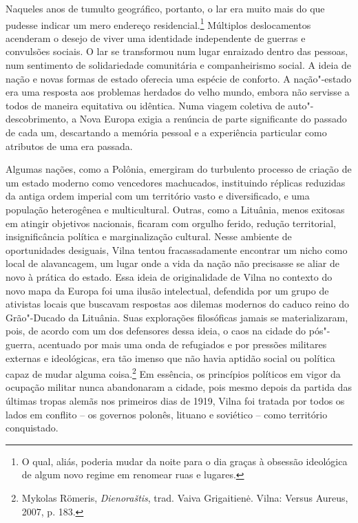 Naqueles anos de tumulto geográfico, portanto, o lar era muito mais do
que pudesse indicar um mero endereço residencial.\footnote{O qual, aliás, poderia
mudar da noite para o dia graças à obsessão ideológica de algum novo
regime em renomear ruas e lugares.} Múltiplos deslocamentos acenderam o
desejo de viver uma identidade independente de guerras e convulsões
sociais. O lar se transformou num lugar enraizado dentro das pessoas,
num sentimento de solidariedade comunitária e companheirismo social. A
ideia de nação e novas formas de estado oferecia uma espécie de
conforto. A nação"-estado era uma resposta aos problemas herdados do
velho mundo, embora não servisse a todos de maneira equitativa ou
idêntica. Numa viagem coletiva de auto"-descobrimento, a Nova Europa
exigia a renúncia de parte significante do passado de cada um,
descartando a memória pessoal e a experiência particular como atributos
de uma era passada.

Algumas nações, como a Polônia, emergiram do turbulento processo de
criação de um estado moderno como vencedores machucados, instituindo
réplicas reduzidas da antiga ordem imperial com um território vasto e
diversificado, e uma população heterogênea e multicultural. Outras, como
a Lituânia, menos exitosas em atingir objetivos nacionais, ficaram com
orgulho ferido, redução territorial, insignificância política e
marginalização cultural. Nesse ambiente de oportunidades desiguais,
Vilna tentou fracassadamente encontrar um nicho como local de
alavancagem, um lugar onde a vida da nação não precisasse se aliar de
novo à prática do estado. Essa ideia de originalidade de Vilna no
contexto do novo mapa da Europa foi uma ilusão intelectual, defendida
por um grupo de ativistas locais que buscavam respostas aos dilemas
modernos do caduco reino do Grão"-Ducado da Lituânia. Suas explorações
filosóficas jamais se materializaram, pois, de acordo com um dos
defensores dessa ideia, o caos na cidade do pós"-guerra, acentuado por
mais uma onda de refugiados e por pressões militares externas e
ideológicas, era tão imenso que não havia aptidão social ou política
capaz de mudar alguma coisa.\footnote{Mykolas Römeris, \textit{Dienoraštis}, trad. Vaiva Grigaitienė. Vilna: Versus Aureus, 2007, p. 183.} Em essência, os princípios políticos em vigor da ocupação militar nunca abandonaram a cidade, pois mesmo depois da
partida das últimas tropas alemãs nos primeiros dias de 1919, Vilna foi
tratada por todos os lados em conflito -- os governos polonês, lituano e
soviético -- como território conquistado.

